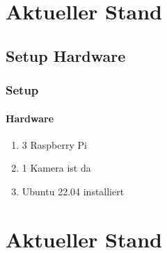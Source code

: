 \documentclass[]{beamer}
\begin{document}
\section{Aktueller Stand}
\subsection{Setup Hardware}
\begin{frame}
	\frametitle{Setup}
	\framesubtitle{Hardware}
	\begin{enumerate}
		\item 3 Raspberry Pi
		\item 1 Kamera ist da
		\item Ubuntu 22.04 installiert
	\end{enumerate}
\end{frame}


\section{Aktueller Stand}
\end{document}
